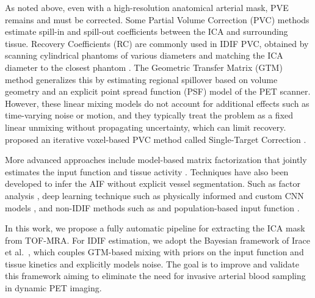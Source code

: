 As noted above, even with a high-resolution anatomical arterial mask, PVE remains and must be corrected.
Some Partial Volume Correction (PVC) methods estimate spill-in and spill-out coefficients between the ICA and surrounding tissue.
Recovery Coefficients (RC) are commonly used in IDIF PVC, obtained by scanning cylindrical phantoms of various diameters and matching the ICA diameter to the closest phantom \cite{feng2015image,dassanayake2022caliper,lyoo2014image}.
The Geometric Transfer Matrix (GTM) method generalizes this by estimating regional spillover based on volume geometry and an explicit point spread function (PSF) model of the PET scanner\cite{rousset1998correction}.
However, these linear mixing models do not account for additional effects such as time-varying noise or motion, and they typically treat the problem as a fixed linear unmixing without propagating uncertainty, which can limit recovery.
\citeauthor{sari2017estimation} proposed an iterative voxel-based PVC method called Single-Target Correction \cite{sari2017estimation}.

More advanced approaches include model-based matrix factorization that jointly estimates the input function and tissue activity \cite{fang2022image}.
Techniques have also been developed to infer the AIF without explicit vessel segmentation.
Such as factor analysis \cite{simoncic2015image}, deep learning technique such as physically informed \cite{ferrante2024physically} and custom CNN models \cite{kawauchi2023convolutional}, and non-IDIF methods such as and population-based input function \cite{dias2022clinical}.


In this work, we propose a fully automatic pipeline for extracting the ICA mask from TOF-MRA.
For IDIF estimation, we adopt the Bayesian framework of Irace et al.\ \cite{irace2021bayesian}, which couples GTM-based mixing with priors on the input function and tissue kinetics and explicitly models noise.
The goal is to improve and validate this framework aiming to eliminate the need for invasive arterial blood sampling in dynamic PET imaging.
